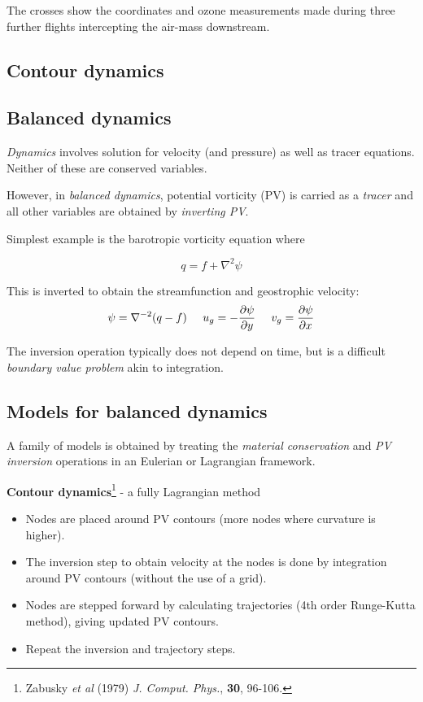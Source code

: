 	The crosses show the coordinates and ozone measurements made during
	three further flights intercepting the air-mass downstream.


\subsection{Contour dynamics}
\subsection{Balanced dynamics} 

	
	{\em Dynamics} involves solution for velocity (and pressure) as well as
	tracer equations. Neither of these are conserved variables.
	
	\vspace{0.5cm}
	However, in {\em balanced dynamics}, potential vorticity (PV) is carried as a
	{\em tracer} and all other variables are obtained by {\em inverting PV}.
	
	\vspace{0.5cm}
	Simplest example is the barotropic vorticity equation where
	
	\[
	q=f+\nabla^2 \psi
	\]
	
	This is inverted to obtain the streamfunction and geostrophic velocity:
	\[
	\psi=\nabla^{-2} (q-f)\;\;\;\;\;
	u_g=-\frac{\partial \psi}{\partial y}  \;\;\;\;\;
	v_g=\frac{\partial \psi}{\partial x} \]
	
	The inversion operation typically does not depend on time, but is a
	difficult {\em boundary value problem} akin to integration.
	


\subsection{Models for balanced dynamics} 

	
	A family of models is obtained by treating the {\em material
		conservation} and {\em PV inversion} operations in an Eulerian or
	Lagrangian framework.
	
	\vspace{0.5cm}
	{\bf Contour dynamics}\footnote{\BTi
		Zabusky {\em et al} (1979) \emph{J. Comput. Phys.}, {\bf 30},
		96-106.\ETi}
	- a fully Lagrangian method
	
	\begin{itemize}
		\item
		Nodes are placed around PV contours (more nodes where curvature is higher). 
		\item
		The inversion step to obtain velocity at the nodes is done by
		integration around PV contours (without the use of a grid).
		\item
		Nodes are stepped forward by calculating trajectories (4th order
		Runge-Kutta method), giving updated PV contours.
		\item
		Repeat the inversion and trajectory steps.
	\end{itemize}
	
